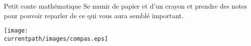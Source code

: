 

\hspace{1cm}

\begin{center}
    \begin{myBox}{Petit conte mathématique}
        Se munir de papier et d'un crayon et prendre des notes pour pouvoir reparler de ce qui vous aura semblé important.

        \bigskip
        
    \end{myBox}
\end{center}

\hspace{1cm}

\begin{center}
    \texttt{[image: \\currentpath/images/compas.eps]}
\end{center}
